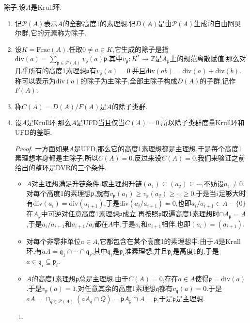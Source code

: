 除子.设$A$是Krull环.
\begin{enumerate}
	\item 记$\mathscr{P}(A)$表示$A$的全部高度1的素理想.记$D(A)$是由$\mathscr{P}(A)$生成的自由阿贝尔群,它的元素称为除子.
	\item 设$K=\mathrm{Frac}(A)$,任取$0\not=a\in K$,它生成的除子是指$\mathrm{div}(a)=\sum_{\mathfrak{p}\in\mathscr{P}(A)}v_{\mathfrak{p}}(a)\mathfrak{p}$.其中$v_{\mathfrak{p}}:K^*\to\mathbb{Z}$是$A_{\mathfrak{p}}$上的规范离散赋值.那么对几乎所有的高度1素理想$\mathfrak{p}$有$v_{\mathfrak{p}}(a)=0$.并且$\mathrm{div}(ab)=\mathrm{div}(a)+\mathrm{div}(b)$.称可以表示为$\mathrm{div}(a)$的除子为主除子,全部主除子构成$D(A)$的子群,记作$F(A)$.
	\item 称$C(A)=D(A)/F(A)$是$A$的除子类群.
	\item 设$A$是Krull环,那么$A$是UFD当且仅当$C(A)=0$.所以除子类群度量Krull环和UFD的差距.
	\begin{proof}
		
		一方面如果$A$是UFD,那么它的高度1素理想都是主理想,于是每个高度1素理想本身都是主除子,所以$C(A)=0$.反过来设$C(A)=0$.我们来验证之前给出的整环是DVR的三个条件.
		\begin{itemize}
			\item $A$对主理想满足升链条件.取主理想升链$(a_1)\subseteq(a_2)\subseteq\cdots$,不妨设$a_1\not=0$.对每个高度1的素理想$\mathfrak{p}$,就有$v_{\mathfrak{p}}(a_1)\ge v_{\mathfrak{p}}(a_2)\ge\cdots\ge0$.于是当$i$足够大时有$\mathrm{div}(a_i)=\mathrm{div}(a_{i+1})$,于是$\mathrm{div}(a_i/a_{i+1})=0$,也即$a_i/a_{i+1}\in A-\{0\}$在$A_{\mathfrak{p}}$中可逆对任意高度1素理想$\mathfrak{p}$成立.再按照$\mathfrak{p}$取遍高度1素理想时$\cap A_{\mathfrak{p}}=A$,于是$a_i/a_{i+1}$和$a_{i+1}/a_i$都在$A$中,于是$a_i$和$a_{i+1}$相伴,也即$(a_i)=(a_{i+1})$.
			\item 对每个非零非单位$a\in A$,它都包含在某个高度1的素理想中.由于$A$是Krull环,有$aA=\mathfrak{q}_1\cap\cdots\cap\mathfrak{q}_r$,其中$\mathfrak{q}_i$是$\mathfrak{p}_i$准素理想,并且$\mathfrak{p}_i$是高度1的.于是$a\in\mathfrak{q}_i\subseteq\mathfrak{p}_i$.
			\item $A$的高度1素理想$\mathfrak{p}$总是主理想.由于$C(A)=0$,存在$a\in A$使得$\mathfrak{p}=\mathrm{div}(a)$.于是$v_{\mathfrak{p}}(a)=1$,对任意其余的高度1素理想$\mathfrak{q}$都有$v_{\mathfrak{q}}(a)=0$.于是$aA=\cap_{q\in\mathscr{P}(A)}(aA_{\mathfrak{q}}\cap Q)=\mathfrak{p}A_{\mathfrak{p}}\cap A=\mathfrak{p}$,于是$\mathfrak{p}$是主理想.
		\end{itemize}
	\end{proof}
\end{enumerate}

